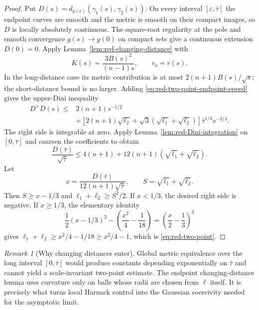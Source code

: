 \documentclass[10pt]{coll-l}
\theoremstyle{definition}
\theoremstyle{remark}
\newtheorem{remark}[theorem]{Remark}
\numberwithin{section}{chapter}
\numberwithin{equation}{chapter}
\begin{document}
\begin{proof}
Put $D(s)=d_{g(s)}(\gamma_1(s),\gamma_2(s))$.  On every interval
$[\varepsilon,\bar\tau]$ the endpoint curves are smooth and the metric is
smooth on their compact images, so $D$ is locally absolutely continuous.
The square-root regularity at the pole and smooth convergence $g(s)\to g(0)$
on compact sets give a continuous extension $D(0)=0$.  Apply
Lemma~\ref{lem:red-changing-distance} with
\begin{equation}
                       K(s)=\frac{3B(s)^2}{(n-1)s},
                       \qquad r_0=r(s).                 \label{eq:red-two-point-K}
\end{equation}
In the long-distance case its metric contribution is at most
$2(n+1)B(s)/\sqrt s$; the short-distance bound is no larger.  Adding
\eqref{eq:red-two-point-endpoint-speed} gives the upper-Dini inequality
\begin{align}
 D^+D(s)\leq{}&2(n+1)s^{-1/2}                            \label{eq:red-two-point-D-prime}\\
 &+\left[2(n+1)\sqrt{\ell_2}
       +\sqrt3(\sqrt{\ell_1}+\sqrt{\ell_2})\right]
       \bar\tau^{1/4}s^{-3/4}.\nonumber
\end{align}
The right side is integrable at zero.  Apply
Lemma~\ref{lem:red-Dini-integration} on $[0,\bar\tau]$ and coarsen the
coefficients to obtain
\begin{equation}
 \frac{D(\bar\tau)}{\sqrt{\bar\tau}}
 \leq4(n+1)+12(n+1)(\sqrt{\ell_1}+\sqrt{\ell_2}).       \label{eq:red-two-point-D-integrated}
\end{equation}
Let
\begin{equation}
 x=\frac{D(\bar\tau)}{12(n+1)\sqrt{\bar\tau}},
 \qquad S=\sqrt{\ell_1}+\sqrt{\ell_2}.                 \label{eq:red-two-point-x-S}
\end{equation}
Then $S\geq x-1/3$ and
$\ell_1+\ell_2\geq S^2/2$.  If $x<1/3$, the desired right side is negative.
If $x\geq1/3$, the elementary identity
\begin{equation}
 \frac12(x-1/3)^2
       -\left(\frac{x^2}{4}-\frac1{18}\right)
       =\left(\frac x2-\frac13\right)^2                 \label{eq:red-two-point-elementary}
\end{equation}
gives
$\ell_1+\ell_2\geq x^2/4-1/18\geq x^2/4-1$, which is
\eqref{eq:red-two-point}.
\end{proof}

\begin{remark}[Why changing distances enter]
\label{rem:red-changing-distance-role}
Global metric equivalence over the long interval $[0,\bar\tau]$ would
produce constants depending exponentially on $\bar\tau$ and cannot yield a
scale-invariant two-point estimate.  The endpoint changing-distance lemma
uses curvature only on balls whose radii are chosen from $\ell$ itself.  It
is precisely what turns local Harnack control into the Gaussian coercivity
needed for the asymptotic limit.
\end{remark}
\end{document}
